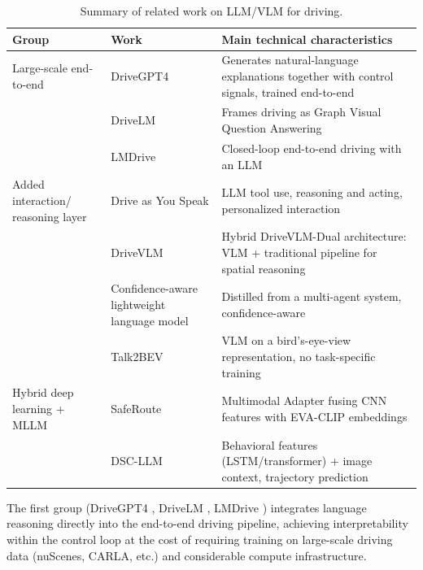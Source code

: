 \documentclass[12pt,a4paper]{report}
\begin{document}
\begin{table}[!htbp]
    \centering
    \footnotesize
    \renewcommand{\arraystretch}{1.25}
    \caption{Summary of related work on LLM/VLM for driving.}
    \label{tab:2.1}
    \begin{tabularx}{\linewidth}{
        >{\RaggedRight\arraybackslash}p{3.0cm}
        >{\RaggedRight\arraybackslash}p{3.6cm}
        >{\RaggedRight\arraybackslash}X
    }
        \toprule
        \textbf{Group} & \textbf{Work} & \textbf{Main technical characteristics} \\
        \midrule
        Large-scale end-to-end & DriveGPT4 \cite{xu2024drivegpt4} & Generates natural-language explanations together with control signals, trained end-to-end \\
         & DriveLM \cite{sima2024drivelm} & Frames driving as Graph Visual Question Answering \\
         & LMDrive \cite{shao2024lmdrive} & Closed-loop end-to-end driving with an LLM \\
        Added interaction/ reasoning layer & Drive as You Speak \cite{cui2024driveasyouspeak} & LLM tool use, reasoning and acting, personalized interaction \\
         & DriveVLM \cite{tian2024drivevlm} & Hybrid DriveVLM-Dual architecture: VLM + traditional pipeline for spatial reasoning \\
         & Confidence-aware lightweight language model \cite{yao2026confidenceaware} & Distilled from a multi-agent system, confidence-aware \\
         & Talk2BEV \cite{choudhary2024talk2bev} & VLM on a bird's-eye-view representation, no task-specific training \\
        Hybrid deep learning + MLLM & SafeRoute \cite{shaw2025saferoute} & Multimodal Adapter fusing CNN features with EVA-CLIP embeddings \\
         & DSC-LLM \cite{kim2025dscllm} & Behavioral features (LSTM/transformer) + image context, trajectory prediction \\
        \bottomrule
    \end{tabularx}
\end{table}

The first group (DriveGPT4 \cite{xu2024drivegpt4}, DriveLM \cite{sima2024drivelm}, LMDrive \cite{shao2024lmdrive}) integrates language reasoning directly into the end-to-end driving pipeline, achieving interpretability within the control loop at the cost of requiring training on large-scale driving data (nuScenes, CARLA, etc.) and considerable compute infrastructure.
\end{document}
